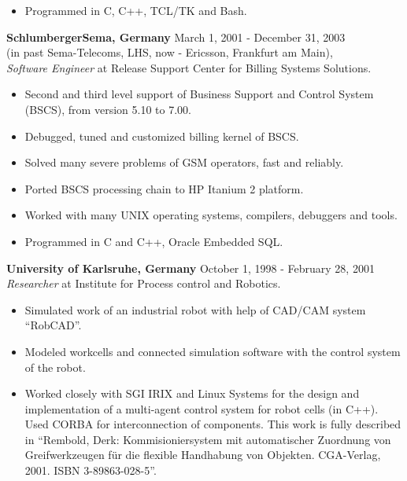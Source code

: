 \documentclass[a4paper,12pt,]{article}
\begin{document}
\begin{description}
\begin{itemize}
    \item Programmed in C, C++, TCL/TK and Bash.

    \end{itemize}

  \item{\bfseries SchlumbergerSema, Germany} \hfill March 1, 2001 - December 31, 2003 \\ 
    (in past Sema-Telecoms, LHS, now - Ericsson, Frankfurt am Main), \\
    {\em Software Engineer} at Release Support Center for Billing Systems Solutions.
    
    \begin{itemize}
      
    \item Second and third level support of Business Support and Control System (BSCS),
      from version 5.10 to 7.00.
      
    \item Debugged, tuned and customized billing kernel of BSCS.

    \item Solved many severe problems of GSM operators, fast and reliably.

    \item Ported BSCS processing chain to HP Itanium 2 platform.
      
    \item Worked with many UNIX operating systems, compilers, debuggers and tools.

    \item Programmed in C and C++, Oracle Embedded SQL.

    \end{itemize}
    
  \item{\bfseries University of Karlsruhe, Germany} \hfill October 1, 1998 - February 28, 2001 \\ 
    {\em Researcher} at Institute for Process control and Robotics.
    
    \begin{itemize}
      
    \item Simulated work of an industrial robot with help of CAD/CAM system ``RobCAD''.

    \item Modeled workcells and connected simulation software with the control system of the robot.

    \item Worked closely with SGI IRIX and Linux Systems for the design and implementation 
      of a multi-agent control system for robot cells (in C++). 
      Used CORBA for interconnection of components. This work is fully described
      in ``Rembold, Derk: Kommisioniersystem mit automatischer Zuordnung von Greifwerkzeugen
      f\"{u}r die flexible Handhabung von Objekten. CGA-Verlag, 2001. ISBN 3-89863-028-5''.


\end{itemize}
\end{description}
\end{document}
